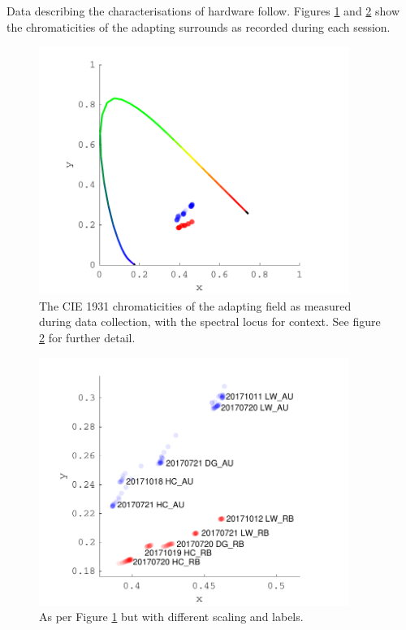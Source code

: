 Data describing the characterisations of hardware follow. Figures \ref{fig:SSLEDs} and \ref{fig:SSLEDs2} show the chromaticities of the adapting surrounds as recorded during each session. 
%
\begin{figure}[htbp]
\includegraphics[max width=0.9\textwidth,center]{figs/SmallSphere/OOwide.pdf}
\caption{The \gls{CIE} 1931 chromaticities of the adapting field as measured during data collection, with the spectral locus for context. See figure \ref{fig:SSLEDs2} for further detail.}
\label{fig:SSLEDs}
\end{figure}
%
\begin{figure}[htbp]
\includegraphics[max width=0.9\textwidth,center]{figs/SmallSphere/OO.pdf}
\caption{As per Figure \ref{fig:SSLEDs} but with different scaling and labels.}
\label{fig:SSLEDs2}
\end{figure}
